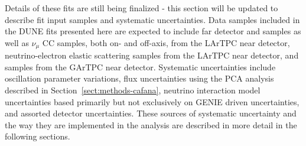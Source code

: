 Details of these fits are still being finalized - this section will be updated to describe fit input samples and systematic uncertainties. Data samples included in the DUNE fits presented here are expected to include far detector \numutonumu and \numutonue samples as well as $\nu_\mu$ CC samples, both on- and off-axis, from the LArTPC near detector, neutrino-electron elastic scattering samples from the LArTPC near detector, and samples from the GArTPC near detector. Systematic uncertainties include oscillation parameter variations, flux uncertainties using the PCA analysis described in Section~\ref{sect:methods-cafana}, neutrino interaction model uncertainties based primarily but not exclusively on GENIE driven uncertainties, and assorted detector uncertainties. These sources of systematic uncertainty and the way they are implemented in the analysis are described in more detail in the following sections.
